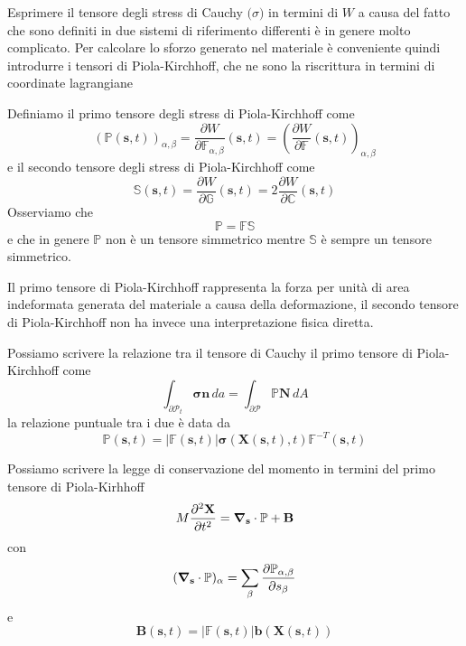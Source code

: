 Esprimere il tensore degli stress di Cauchy $\boldsymbol(\sigma)$ in termini di $W$ a causa del fatto che sono definiti in due sistemi di riferimento differenti è in genere molto complicato.
Per calcolare lo sforzo generato nel materiale è conveniente quindi introdurre i tensori di Piola-Kirchhoff, che ne sono la riscrittura in termini di coordinate lagrangiane

Definiamo il primo tensore degli stress di Piola-Kirchhoff come
\begin{equation*}
(\mathbb{P}(\mathbf{s},t))_{\alpha,\beta} = \frac{\partial W}{\partial \mathbb{F}_{\alpha,\beta}} (\mathbf{s},t) =\left( \frac{\partial W}{\partial \mathbb{F}} (\mathbf{s},t)\right)_{\alpha,\beta}
\end{equation*}
e il secondo tensore degli stress di Piola-Kirchhoff come
\begin{equation*}
\mathbb{S}(\mathbf{s},t)=\frac{\partial W}{\partial\mathbb{G}}(\mathbf{s},t)=2\frac{\partial W}{\partial\mathbb{C}}(\mathbf{s},t)
\end{equation*}
Osserviamo che
\begin{equation*}
\mathbb{P}=\mathbb{F}\mathbb{S}
\end{equation*}
e che in genere $\mathbb{P}$ non è un tensore simmetrico mentre $\mathbb{S}$ è sempre un tensore simmetrico.

Il primo tensore di Piola-Kirchhoff rappresenta la forza per unità di area indeformata generata del materiale a causa della deformazione, il secondo tensore di Piola-Kirchhoff non ha invece una interpretazione fisica diretta.

Possiamo scrivere la relazione tra il tensore di Cauchy il primo tensore di Piola-Kirchhoff come
\begin{equation*}
\int_{\partial\mathcal{P}_t} \boldsymbol{\sigma}\mathbf{n} \, da = \int_{\partial\mathcal{P}} \mathbb{P}\mathbf{N} \, dA
\end{equation*}
la relazione puntuale tra i due è data da
\begin{equation*}
\mathbb{P}(\mathbf{s},t) = \vert \mathbb{F}(\mathbf{s},t) \vert \mathbf{\sigma}(\mathbf{X}(\mathbf{s},t),t) \mathbb{F}^{-T}(\mathbf{s},t)
\end{equation*}

Possiamo scrivere la legge di conservazione del momento in termini del primo tensore di Piola-Kirhhoff
\begin{equation*}
M\frac{\partial^2\mathbf{X}}{\partial t^2} = \boldsymbol{\nabla}_\mathbf{s} \cdot \mathbb{P} + \mathbf{B}
\end{equation*}
con 
\begin{equation*}
(\boldsymbol{\nabla}_\mathbf{s} \cdot \mathbb{P} )_{\alpha} = \sum_{\beta}\frac{\partial\mathbb{P}_{\alpha,\beta}}{\partial s_\beta}
\end{equation*}
e
\begin{equation*}
\mathbf{B}(\mathbf{s},t)=\vert\mathbb{F}(\mathbf{s},t)\vert\mathbf{b}(\mathbf{X}(\mathbf{s},t))
\end{equation*}

